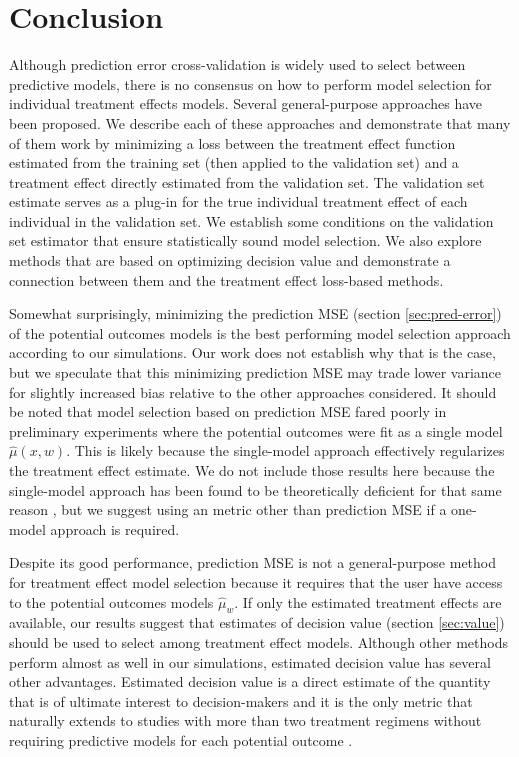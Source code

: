 \section{Conclusion}
\label{conclusion}

Although prediction error cross-validation is widely used to select between predictive models, there is no consensus on how to perform model selection for individual treatment effects models. Several general-purpose approaches have been proposed. We describe each of these approaches and demonstrate that many of them work by minimizing a loss between the treatment effect function estimated from the training set (then applied to the validation set) and a treatment effect directly estimated from the validation set. The validation set estimate serves as a plug-in for the true individual treatment effect of each individual in the validation set. We establish some conditions on the validation set estimator that ensure statistically sound model selection. We also explore methods that are based on optimizing decision value and demonstrate a connection between them and the treatment effect loss-based methods. 

Somewhat surprisingly, minimizing the prediction MSE (section \ref{sec:pred-error}) of the potential outcomes models is the best performing model selection approach according to our simulations. Our work does not establish why that is the case, but we speculate that this minimizing prediction MSE may trade lower variance for slightly increased bias relative to the other approaches considered. It should be noted that model selection based on prediction MSE fared poorly in preliminary experiments where the potential outcomes were fit as a single model $\hat\mu(x,w)$. This is likely because the single-model approach effectively regularizes the treatment effect estimate. We do not include those results here because the single-model approach has been found to be theoretically deficient for that same reason \cite{Alaa:tj}, but we suggest using an metric other than prediction MSE if a one-model approach is required. 

Despite its good performance, prediction MSE is not a general-purpose method for treatment effect model selection because it requires that the user have access to the potential outcomes models $\hat\mu_w$. If only the estimated treatment effects are available, our results suggest that estimates of decision value (section \ref{sec:value}) should be used to select among treatment effect models. Although other methods perform almost as well in our simulations, estimated decision value has several other advantages. Estimated decision value is a direct estimate of the quantity that is of ultimate interest to decision-makers and it is the only metric that naturally extends to studies with more than two treatment regimens without requiring predictive models for each potential outcome \cite{Zhao:2017vi}. 


